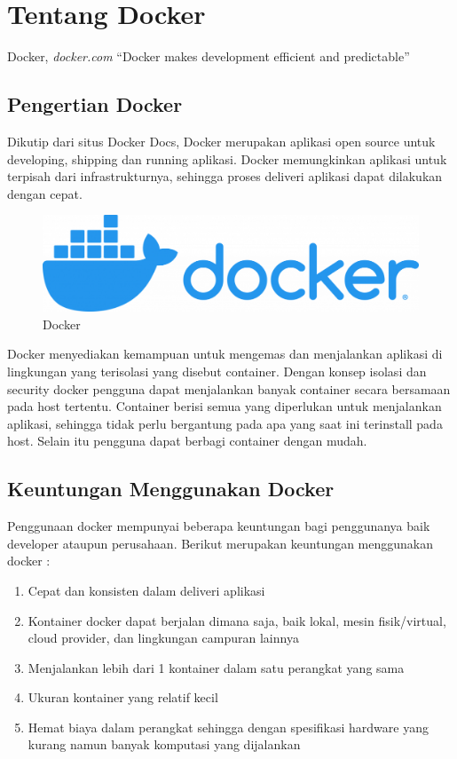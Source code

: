 \chapter{Tentang Docker}

\begin{chapquote}{Docker, \textit{docker.com}}
    ``Docker makes development efficient and predictable''
    \end{chapquote}

\section{Pengertian Docker}

\noindent Dikutip dari situs Docker Docs, Docker merupakan aplikasi open source untuk developing, shipping dan running aplikasi. 
Docker memungkinkan aplikasi untuk terpisah dari infrastrukturnya, sehingga proses deliveri aplikasi dapat dilakukan dengan cepat.
\begin{figure}
    \begin{center}
        \includegraphics[width=\linewidth]{image/docker.PNG}
        \caption{Docker}
        \label{fig:my_figure1}
    \end{center}
\end{figure}

Docker menyediakan kemampuan untuk mengemas dan menjalankan aplikasi di lingkungan yang terisolasi yang disebut container.
Dengan konsep isolasi dan security docker pengguna dapat menjalankan banyak container secara bersamaan pada host tertentu. Container berisi 
semua yang diperlukan untuk menjalankan aplikasi, sehingga tidak perlu bergantung pada apa yang saat ini terinstall pada host. Selain itu
pengguna dapat berbagi container dengan mudah.


\section{Keuntungan Menggunakan Docker}
\noindent Penggunaan docker mempunyai beberapa keuntungan bagi penggunanya baik developer ataupun perusahaan. 
Berikut merupakan keuntungan menggunakan docker : 
\begin{enumerate}
    \item Cepat dan konsisten dalam deliveri aplikasi
    \item Kontainer docker dapat berjalan dimana saja, baik lokal, mesin fisik/virtual, cloud provider, dan lingkungan campuran lainnya
    \item Menjalankan lebih dari 1 kontainer dalam satu perangkat yang sama
    \item Ukuran kontainer yang relatif kecil
    \item Hemat biaya dalam perangkat sehingga dengan spesifikasi hardware yang kurang namun banyak komputasi yang dijalankan
\end{enumerate}


